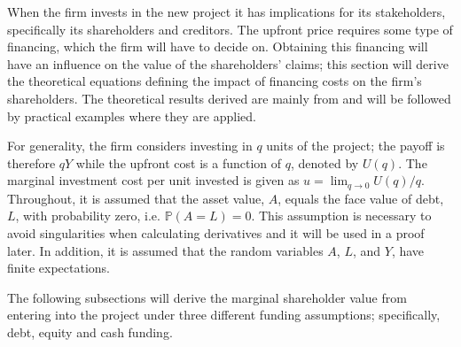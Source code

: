 \documentclass[main.tex]{subfiles}
\begin{document}
    When the firm invests in the new project it has implications for its stakeholders,
    specifically its shareholders and creditors.
    The upfront price requires some type of financing, 
    which the firm will have to decide on.
    Obtaining this financing will have an influence on the value of the shareholders' claims;
    this section will derive the theoretical equations defining
    the impact of financing costs on the firm's shareholders.
    The theoretical results derived are mainly from \textcite{ADS2019} 
    and will be followed by practical examples where they are applied.

    For generality, the firm considers investing in $q$ units of the project; 
    the payoff is therefore $qY$ while the upfront cost is a function of $q$, denoted by $U(q)$. 
    The marginal investment cost per unit invested is given as 
    $u = \lim_{q\rightarrow 0} U(q) / q$.
    Throughout, it is assumed that the asset value, $A$, equals the face value of debt, $L$, 
    with probability zero, i.e. $\mathbb{P}\left(A = L\right) = 0$.
    This assumption is necessary to avoid singularities when calculating derivatives
    and it will be used in a proof later.
    In addition, it is assumed that the random variables
    $A$, $L$, and $Y$, have finite expectations.

    The following subsections will derive the marginal shareholder value from entering into the project
    under three different funding assumptions; specifically, debt, equity and cash funding.
\end{document}
